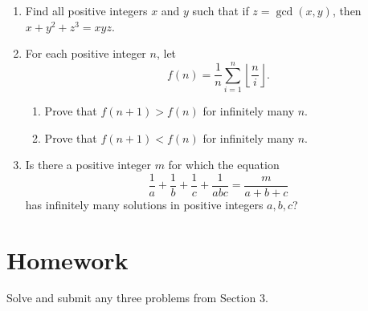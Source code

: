 \documentclass{article}
\begin{document}
\begin{enumerate}
  \item Find all positive integers $x$ and $y$ such that if $z=\gcd(x,y)$, then
    $x+y^2+z^3=xyz$.
  \item For each positive integer $n$, let
    \[f(n)=\frac1n\sum_{i=1}^n \left\lfloor\frac ni\right\rfloor.\]
    \begin{enumerate}
      \item Prove that $f(n+1)>f(n)$ for infinitely many $n$.
      \item Prove that $f(n+1)<f(n)$ for infinitely many $n$.
    \end{enumerate}
  \item Is there a positive integer $m$ for which the equation
    \[\frac1a+\frac1b+\frac1c+\frac1{abc}=\frac m{a+b+c}\]
    has infinitely many solutions in positive integers $a,b,c$?
\end{enumerate}
\section{Homework}
Solve and submit any three problems from Section 3.
\newpage
\end{document}
